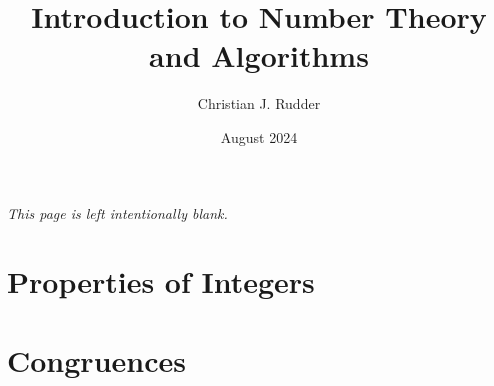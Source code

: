 \documentclass{memoir}
\title{Introduction to Number Theory and Algorithms}
\author{Christian J. Rudder}
\date{August 2024}
\begin{document}
\maketitle
\setcounter{tocdepth}{2}

\tableofcontents

\newpage
\thispagestyle{empty}
\mbox{}
\vfill
\begin{center}
    \textit{This page is left intentionally blank.}
\end{center}
\vfill
\newpage




\chapter{Properties of Integers}





\chapter{Congruences}







\end{document}

